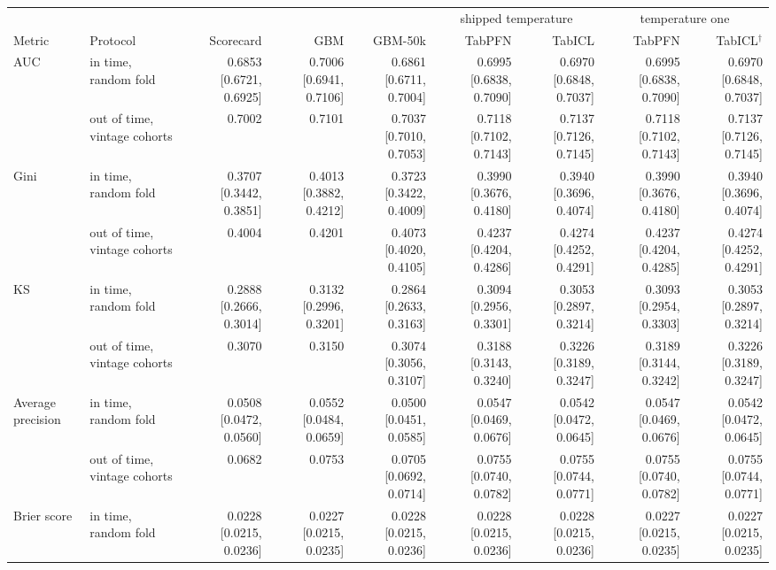 \begin{tabular}{llrrrrrrr}
\toprule
 & & & & & \multicolumn{2}{c}{shipped temperature} & \multicolumn{2}{c}{temperature one} \\
\cmidrule(lr){6-7}\cmidrule(lr){8-9}
Metric & Protocol & Scorecard & GBM & GBM-50k & TabPFN & TabICL & TabPFN & TabICL$^{\dagger}$ \\
\midrule
AUC & in time, random fold & 0.6853 [0.6721, 0.6925] & 0.7006 [0.6941, 0.7106] & 0.6861 [0.6711, 0.7004] & 0.6995 [0.6838, 0.7090] & 0.6970 [0.6848, 0.7037] & 0.6995 [0.6838, 0.7090] & 0.6970 [0.6848, 0.7037] \\
 & out of time, vintage cohorts & 0.7002 & 0.7101 & 0.7037 [0.7010, 0.7053] & 0.7118 [0.7102, 0.7143] & 0.7137 [0.7126, 0.7145] & 0.7118 [0.7102, 0.7143] & 0.7137 [0.7126, 0.7145] \\
\addlinespace
Gini & in time, random fold & 0.3707 [0.3442, 0.3851] & 0.4013 [0.3882, 0.4212] & 0.3723 [0.3422, 0.4009] & 0.3990 [0.3676, 0.4180] & 0.3940 [0.3696, 0.4074] & 0.3990 [0.3676, 0.4180] & 0.3940 [0.3696, 0.4074] \\
 & out of time, vintage cohorts & 0.4004 & 0.4201 & 0.4073 [0.4020, 0.4105] & 0.4237 [0.4204, 0.4286] & 0.4274 [0.4252, 0.4291] & 0.4237 [0.4204, 0.4285] & 0.4274 [0.4252, 0.4291] \\
\addlinespace
KS & in time, random fold & 0.2888 [0.2666, 0.3014] & 0.3132 [0.2996, 0.3201] & 0.2864 [0.2633, 0.3163] & 0.3094 [0.2956, 0.3301] & 0.3053 [0.2897, 0.3214] & 0.3093 [0.2954, 0.3303] & 0.3053 [0.2897, 0.3214] \\
 & out of time, vintage cohorts & 0.3070 & 0.3150 & 0.3074 [0.3056, 0.3107] & 0.3188 [0.3143, 0.3240] & 0.3226 [0.3189, 0.3247] & 0.3189 [0.3144, 0.3242] & 0.3226 [0.3189, 0.3247] \\
\addlinespace
Average precision & in time, random fold & 0.0508 [0.0472, 0.0560] & 0.0552 [0.0484, 0.0659] & 0.0500 [0.0451, 0.0585] & 0.0547 [0.0469, 0.0676] & 0.0542 [0.0472, 0.0645] & 0.0547 [0.0469, 0.0676] & 0.0542 [0.0472, 0.0645] \\
 & out of time, vintage cohorts & 0.0682 & 0.0753 & 0.0705 [0.0692, 0.0714] & 0.0755 [0.0740, 0.0782] & 0.0755 [0.0744, 0.0771] & 0.0755 [0.0740, 0.0782] & 0.0755 [0.0744, 0.0771] \\
\addlinespace
Brier score & in time, random fold & 0.0228 [0.0215, 0.0236] & 0.0227 [0.0215, 0.0235] & 0.0228 [0.0215, 0.0236] & 0.0228 [0.0215, 0.0236] & 0.0228 [0.0215, 0.0236] & 0.0227 [0.0215, 0.0235] & 0.0227 [0.0215, 0.0235] \\

\end{tabular}
